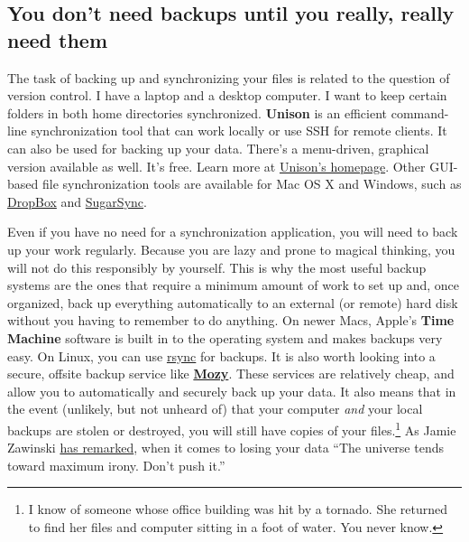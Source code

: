 \documentclass[11pt,article,oneside]{memoir}
\begin{document}
\subsection{You don't need backups until you really, really need them}
The task of backing up and synchronizing your files is related to the question of version control. I have a laptop and a desktop computer. I want to keep certain folders in both home directories synchronized. \textbf{Unison} is an efficient command-line synchronization tool that can work locally or use SSH for remote clients. It can also be used for backing up your data. There's a menu-driven, graphical version available as well. It's free. Learn more at \href{http://www.cis.upenn.edu/~bcpierce/unison/}{Unison's homepage}. Other GUI-based file synchronization tools are available for Mac OS X and Windows, such as \href{http://www.getdropbox.com}{DropBox} and \href{http://www.sugarsync.com/}{SugarSync}.

Even if you have no need for a synchronization application, you will need to back up your work regularly. Because you are lazy and prone to magical thinking, you will not do this responsibly by yourself. This is why the most useful backup systems are the ones that require a minimum amount of work to set up and, once organized, back up everything automatically to an external (or remote) hard disk without you having to remember to do anything. On newer Macs, Apple's \textbf{Time Machine} software is built in to the operating system and makes backups very easy. On Linux, you can use \href{http://www.psychocats.net/ubuntu/backup}{rsync} for backups. It is also  worth looking into a secure, offsite backup service like \href{http://mozy.com/}{\textbf{Mozy}}. These services are relatively cheap, and allow you to automatically and securely back up your data. It also means that in the event (unlikely, but not unheard of) that your computer \emph{and} your local backups are stolen or destroyed, you will still have copies of your files.\footnote{I know of someone whose office building was hit by a tornado. She returned to find her files and computer sitting in a foot of water. You never know.} As Jamie Zawinski \href{http://jwz.livejournal.com/801607.html}{has remarked}, when it comes to losing your data ``The universe tends toward maximum irony. Don't push it.''
\end{document}
